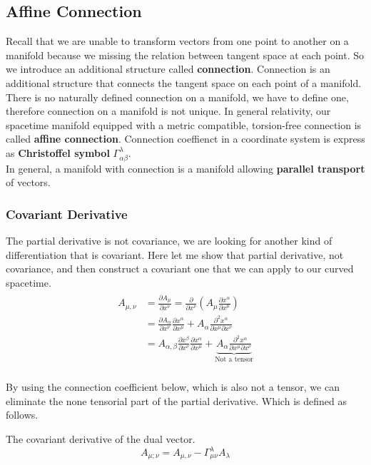 \documentclass[12pt]{article}
\theoremstyle{mystyle}{\newtheorem{definition}{Definition}[section]}
\theoremstyle{mystyle}{\newtheorem{theorem}[definition]{Theorem}}
\theoremstyle{mystyle}{\newtheorem*{remark}{Remark}}
\theoremstyle{mystyle}{\newtheorem*{example}{Example}}
\theoremstyle{mystyle}{\newtheorem*{examples}{Examples}}
\theoremstyle{cstyle}{\newtheorem*{cthm}{}}
\begin{document}
\subsection{Affine Connection}
Recall that we are unable to transform vectors from one point to another on a manifold
because we missing the relation between tangent space at each point. So we introduce an additional structure called \textbf{connection}.
Connection is an additional structure that connects the tangent space on each point of a manifold.
There is no naturally defined connection on a manifold, we have to define one, therefore connection on a manifold is not unique.
In general relativity, our spacetime manifold equipped with a metric compatible, torsion-free connection is called \textbf{affine connection}.
Connection coeffienct in a coordinate system is express as \textbf{Christoffel symbol} \(\Gamma^{\lambda}_{\alpha\beta}\).\\
In general, a manifold with connection is a manifold allowing \textbf{parallel transport} of vectors.

\subsubsection{Covariant Derivative}
The partial derivative is not covariance, we are looking for another kind of differentiation that is covariant.
Here let me show that partial derivative, not covariance, and then construct a covariant one that we can apply to our curved spacetime.
\begin{align*}
  \begin{split}
    A_{\mu,\nu} &= \frac{\partial A_{\mu}}{\partial x^{\nu}} = \frac{\partial}{\partial x^{\nu}}
    \left( A_{\mu}\frac{\partial x^{\alpha}}{\partial x^{\mu}}\right)\\
    &= \frac{\partial A_\alpha}{\partial x^{\nu}}\frac{\partial x^{\alpha}}{\partial x^{\mu}}+
    A_{\alpha} \frac{\partial^2 x^{\alpha}}{\partial x^{\mu} \partial x^{\nu}}\\
    &= A_{\alpha,\beta}\frac{\partial x^{\beta}}{\partial x^{\nu}}\frac{\partial x^{\alpha}}{\partial x^{\mu}} +
    \underbrace{A_{\alpha} \frac{\partial^2 x^{\alpha}}{\partial x^{\mu} \partial x^{\nu}}}_\text{Not a tensor}
  \end{split}
\end{align*}\\
By using the connection coefficient below, which is also not a tensor, we can eliminate the none tensorial part of the partial derivative.
Which is defined as follows.
\begin{definition}
  The covariant derivative of the dual vector.
  \[A_{\mu;\nu} = A_{\mu,\nu} - \Gamma^{\lambda}_{\mu\nu}A_{\lambda}\]
\end{definition}
\end{document}
